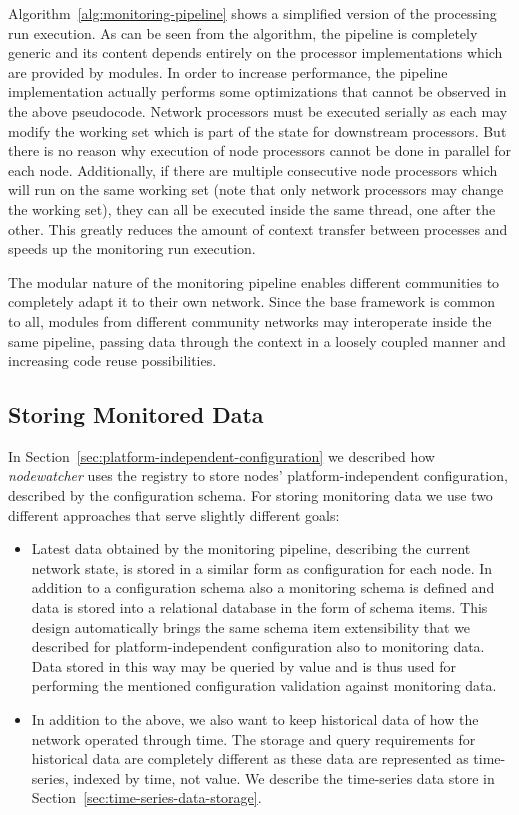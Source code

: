 \documentclass[5p,sort&compress]{elsarticle}
\newcommand{\nodewatcher}{\textit{nodewatcher}}
\begin{document}
Algorithm~\ref{alg:monitoring-pipeline} shows a simplified version of the processing run execution.
As can be seen from the algorithm, the pipeline is completely generic and its content depends entirely on the processor implementations which are provided by modules.
In order to increase performance, the pipeline implementation actually performs some optimizations that cannot be observed in the above pseudocode.
Network processors must be executed serially as each may modify the working set which is part of the state for downstream processors.
But there is no reason why execution of node processors cannot be done in parallel for each node.
Additionally, if there are multiple consecutive node processors which will run on the same working set (note that only network processors may change the working set), they can all be executed inside the same thread, one after the other.
This greatly reduces the amount of context transfer between processes and speeds up the monitoring run execution.

The modular nature of the monitoring pipeline enables different communities to completely adapt it to their own network.
Since the base framework is common to all, modules from different community networks may interoperate inside the same pipeline, passing data through the context in a loosely coupled manner and increasing code reuse possibilities.

\subsection{Storing Monitored Data}

In Section~\ref{sec:platform-independent-configuration} we described how \nodewatcher{} uses the registry to store nodes' platform-independent configuration, described by the configuration schema.
For storing monitoring data we use two different approaches that serve slightly different goals:
\begin{itemize}
\item Latest data obtained by the monitoring pipeline, describing the current network state, is stored in a similar form as configuration for each node.
In addition to a configuration schema also a monitoring schema is defined and data is stored into a relational database in the form of schema items.
This design automatically brings the same schema item extensibility that we described for platform-independent configuration also to monitoring data.
Data stored in this way may be queried by value and is thus used for performing the mentioned configuration validation against monitoring data.

\item In addition to the above, we also want to keep historical data of how the network operated through time.
The storage and query requirements for historical data are completely different as these data are represented as time-series, indexed by time, not value.
We describe the time-series data store in Section~\ref{sec:time-series-data-storage}.
\end{itemize}
\end{document}
